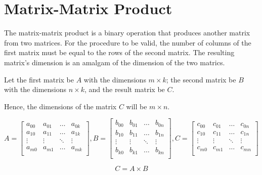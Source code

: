 \chapter{Matrix-Matrix Product}

The matrix-matrix product is a binary operation that produces 
another matrix from two matrices. For the procedure to be valid, 
the number of columns of the first matrix must be equal to the 
rows of the second matrix. The resulting matrix's dimension is 
an amalgam of the dimension of the two matrics.

Let the first matrix be $A$ with the dimensions $m \times k$; 
the second matrix be $B$ with the dimensions $n \times k$, 
and the result matrix be $C$.

Hence, the dimensions of the matrix $C$ will be $m \times n$.

$
A= 
\begin{bmatrix}
    a_{00}  & a_{01}    & \dots     & a_{0k}\\
    a_{10}  & a_{11}    & \dots     & a_{1k}\\
    \vdots  & \vdots    & \ddots    & \vdots\\
    a_{m0}  & a_{m1}    & \dots     & a_{mk}\\
\end{bmatrix}
,
B= 
\begin{bmatrix}
    b_{00}  & b_{01}    & \dots     & b_{0n}\\
    b_{10}  & b_{11}    & \dots     & b_{1n}\\
    \vdots  & \vdots    & \ddots    & \vdots\\
    b_{k0}  & b_{k1}    & \dots     & b_{kn}\\
\end{bmatrix}
,
C= 
\begin{bmatrix}
    c_{00}  & c_{01}    & \dots     & c_{0n}\\
    c_{10}  & c_{11}    & \dots     & c_{1n}\\
    \vdots  & \vdots    & \ddots    & \vdots\\
    c_{m0}  & c_{m1}    & \dots     & c_{mn}\\
\end{bmatrix}
$

\vspace*{0.5cm}

\begin{equation}
    C = A \times B
\end{equation}


